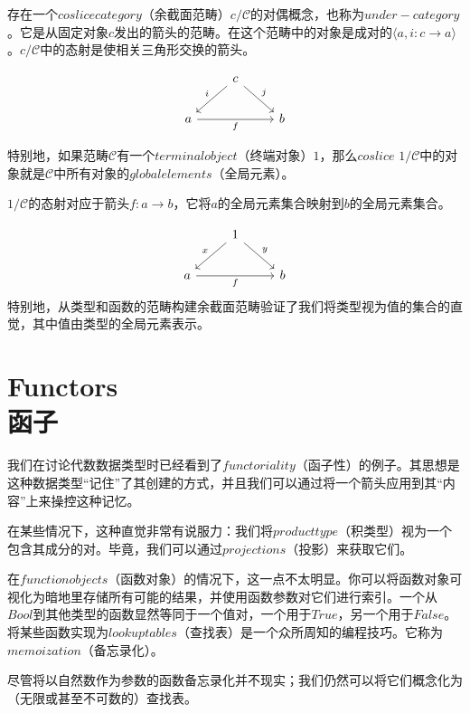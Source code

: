 \documentclass[DaoFP]{subfiles}
\begin{document}
    存在一个$coslice category$（余截面范畴）$c / \mathcal{C}$的对偶概念，也称为$under-category$。它是从固定对象$c$发出的箭头的范畴。在这个范畴中的对象是成对的$\langle a, i \colon c \to a \rangle$。$c / \mathcal{C}$中的态射是使相关三角形交换的箭头。

    \[
        \begin{tikzcd}
            & c
            \arrow[rd, "j"]
            \arrow[ld, "i"']
            \\
            a
            \arrow[rr, "f"']
            && b
        \end{tikzcd}
    \]

    特别地，如果范畴$\mathcal{C}$有一个$terminal object$（终端对象）$1$，那么$coslice$ $1 / \mathcal{C}$中的对象就是$\mathcal{C}$中所有对象的$global elements$（全局元素）。

    $1/  \mathcal{C}$的态射对应于箭头$f \colon a \to b$，它将$a$的全局元素集合映射到$b$的全局元素集合。

    \[
        \begin{tikzcd}
            & 1
            \arrow[rd, "y"]
            \arrow[ld, "x"']
            \\
            a
            \arrow[rr, "f"']
            && b
        \end{tikzcd}
    \]
    特别地，从类型和函数的范畴构建余截面范畴验证了我们将类型视为值的集合的直觉，其中值由类型的全局元素表示。

    \section{Functors\\函子}

    我们在讨论代数数据类型时已经看到了$functoriality$（函子性）的例子。其思想是这种数据类型“记住”了其创建的方式，并且我们可以通过将一个箭头应用到其“内容”上来操控这种记忆。

    在某些情况下，这种直觉非常有说服力：我们将$product type$（积类型）视为一个包含其成分的对。毕竟，我们可以通过$projections$（投影）来获取它们。

    在$function objects$（函数对象）的情况下，这一点不太明显。你可以将函数对象可视化为暗地里存储所有可能的结果，并使用函数参数对它们进行索引。一个从$Bool$到其他类型的函数显然等同于一个值对，一个用于$True$，另一个用于$False$。将某些函数实现为$lookup tables$（查找表）是一个众所周知的编程技巧。它称为$memoization$（备忘录化）。

    尽管将以自然数作为参数的函数备忘录化并不现实；我们仍然可以将它们概念化为（无限或甚至不可数的）查找表。
\end{document}
